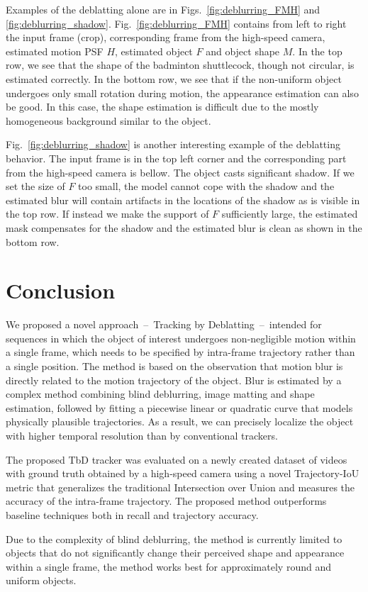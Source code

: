\documentclass[10pt,twocolumn,letterpaper]{article}
\begin{document}
Examples of the deblatting alone are in Figs.~\ref{fig:deblurring_FMH} and \ref{fig:deblurring_shadow}. Fig.~\ref{fig:deblurring_FMH} contains from left to right the input frame (crop), corresponding frame from the high-speed camera, estimated motion PSF $H$, estimated object $F$ and object shape $M$. In the top row, we see that the shape of the badminton shuttlecock, though not circular, is estimated correctly. In the bottom row, we see that if the non-uniform object undergoes only small rotation during motion, the appearance estimation can also be good. In this case, the shape estimation is difficult due to the mostly homogeneous background similar to the object.

Fig.~\ref{fig:deblurring_shadow} is another interesting example of the deblatting behavior. The input frame is in the top left corner and the corresponding part from the high-speed camera is bellow. The object casts significant shadow. If we set the size of $F$ too small, the model cannot cope with the shadow and the estimated blur will contain artifacts in the locations of the shadow as is visible in the top row. If instead we make the support of $F$ sufficiently large, the estimated mask compensates for the shadow and the estimated blur is clean as shown in the bottom row.
 \section{Conclusion}
\label{sec:conclusion}
We proposed a novel approach~--~Tracking by Deblatting~--~intended for sequences in which the object of interest undergoes non-negligible motion within a single frame, which needs to be specified by intra-frame trajectory rather than a single position.
The method is based on the observation that motion blur is directly related to the motion trajectory of the object. Blur is estimated by a complex method combining blind deblurring, image matting and shape estimation, 
followed by fitting a piecewise linear or quadratic curve that models physically plausible trajectories. As a result, we can precisely localize the object with higher temporal resolution than by conventional trackers. 

The proposed TbD tracker was evaluated on a newly created dataset of videos with ground truth obtained by a high-speed camera using a novel Trajectory-IoU metric that generalizes the traditional Intersection over Union and measures the accuracy of the intra-frame trajectory. The proposed method outperforms baseline techniques both in recall and trajectory accuracy. 

Due to the complexity of blind deblurring, the method is currently limited to objects that do not significantly change their perceived shape and appearance within a single frame, the method works best for approximately round and uniform objects.
 

{\small


}
\end{document}
